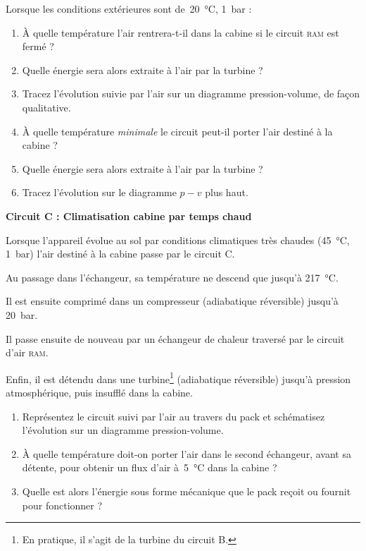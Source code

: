 	Lorsque les conditions extérieures sont de~\SI{20}{\degreeCelsius}, \SI{1}{\bar} :
	
	\begin{enumerate}
		\item À quelle température l’air rentrera-t-il dans la cabine si le circuit \textsc{ram} est fermé ?
		\item Quelle énergie sera alors extraite à l’air par la turbine ?
		\item Tracez l’évolution suivie par l’air sur un diagramme pression-volume, de façon qualitative.
		\item À quelle température \emph{minimale} le circuit peut-il porter l’air destiné à la cabine ?
		\item Quelle énergie sera alors extraite à l’air par la turbine ?
		\item Tracez l’évolution sur le diagramme $p-v$ plus haut.
	\end{enumerate}

\textbf{Circuit C : Climatisation cabine par temps chaud}

	Lorsque l’appareil évolue au sol par conditions climatiques très chaudes (\SI{45}{\degreeCelsius}, \SI{1}{\bar}) l’air destiné à la cabine passe par le circuit C.
	
	Au passage dans l’échangeur, sa température ne descend que jusqu’à \SI{217}{\degreeCelsius}.
	
	Il est ensuite comprimé dans un compresseur (adiabatique réversible) jusqu’à \SI{20}{\bar}.
	
	Il passe ensuite de nouveau par un échangeur de chaleur traversé par le circuit d’air \textsc{ram}.
	
	Enfin, il est détendu dans une turbine\footnote{En pratique, il s’agit de la turbine du circuit B.} (adiabatique réversible) jusqu’à pression atmosphérique, puis insufflé dans la cabine.
		
	\begin{enumerate}
		\item Représentez le circuit suivi par l’air au travers du pack et schématisez l’évolution sur un diagramme pression-volume.
		\item À quelle température doit-on porter l’air dans le second échangeur, avant sa détente, pour obtenir un flux d’air à~\SI{5}{\degreeCelsius} dans la cabine ?
		\item Quelle est alors l’énergie sous forme mécanique que le pack reçoit ou fournit pour fonctionner ?
	\end{enumerate}

